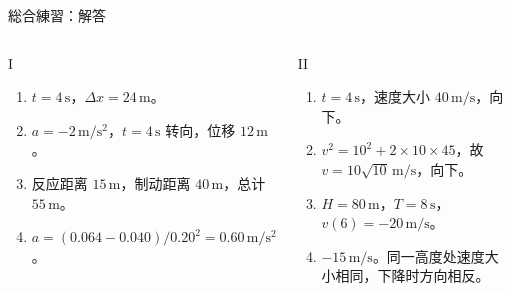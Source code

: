 \documentclass[notheorems,aspectratio=169]{beamer}
\newcommand{\unit}[1]{\,\mathrm{#1}}
\begin{document}
\begin{frame}{総合練習：解答}
  \scriptsize
  \begin{columns}[T,onlytextwidth]
    \begin{block}{I}
      \begin{enumerate}
        \item $t=4\unit{s}$，$\Delta x=24\unit{m}$。
        \item $a=-2\unit{m/s^2}$，$t=4\unit{s}$ 转向，位移 $12\unit{m}$。
        \item 反应距离 $15\unit{m}$，制动距离 $40\unit{m}$，总计 $55\unit{m}$。
        \item $a=(0.064-0.040)/0.20^2=0.60\unit{m/s^2}$。
      \end{enumerate}
    \end{block}
    \begin{alertblock}{II}
      \begin{enumerate}
        \item $t=4\unit{s}$，速度大小 $40\unit{m/s}$，向下。
        \item $v^2=10^2+2\times10\times45$，故 $v=10\sqrt{10}\unit{m/s}$，向下。
        \item $H=80\unit{m}$，$T=8\unit{s}$，$v(6)=-20\unit{m/s}$。
        \item $-15\unit{m/s}$。同一高度处速度大小相同，下降时方向相反。
      \end{enumerate}
    \end{alertblock}
  \end{columns}
\end{frame}
\end{document}
